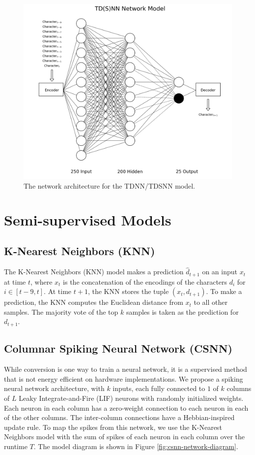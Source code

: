 \documentclass{article}
\begin{document}
\begin{figure}[H]
    \centering
    \includegraphics[width=0.9\linewidth]{../diagrams/tdnn.png}
    \caption{The network architecture for the TDNN/TDSNN model.}
    \label{fig:lstm-online-model}
\end{figure}

\section*{Semi-supervised Models}

\subsection*{K-Nearest Neighbors (KNN)}

The K-Nearest Neighbors (KNN) model makes a prediction $\hat{d}_{t+1}$ on an input $x_t$ at time $t$, where $x_t$ is the concatenation of the encodings of the characters $d_i$ for $i \in [t-9, t]$. At time $t+1$, the KNN stores the tuple $(x_t, d_{t+1})$. To make a prediction, the KNN computes the Euclidean distance from $x_t$ to all other samples. The majority vote of the top $k$ samples is taken as the prediction for $d_{t+1}$.

\subsection*{Columnar Spiking Neural Network (CSNN)}

While conversion is one way to train a neural network, it is a supervised method that is not energy efficient on hardware implementations. We propose a spiking neural network architecture, with $k$ inputs, each fully connected to $1$ of $k$ columns of $L$ Leaky Integrate-and-Fire (LIF) neurons with randomly initialized weights. \cite{gerstner2002spiking} Each neuron in each column has a zero-weight connection to each neuron in each of the other columns. The inter-column connections have a Hebbian-inspired update rule. To map the spikes from this network, we use the K-Nearest Neighbors model with the sum of spikes of each neuron in each column over the runtime $T$. \cite{beliaev2007time} The model diagram is shown in Figure \ref{fig:csnn-network-diagram}.
\end{document}
